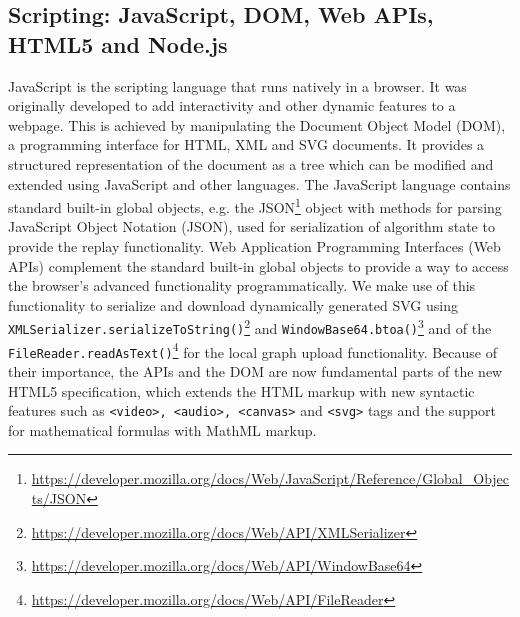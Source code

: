 \subsection{Scripting: JavaScript, DOM, Web APIs, HTML5 and Node.js}\label{sec:script}
JavaScript is the scripting language that runs natively in a browser. It was originally developed to  add interactivity and other dynamic features to a webpage. This is achieved by manipulating the Document Object Model (DOM), a programming interface for HTML, XML and SVG documents. It provides a structured representation of the document as a tree which can be modified and extended using JavaScript and other languages. The JavaScript language contains standard built-in global objects, e.g. the JSON\footnote{\url{https://developer.mozilla.org/docs/Web/JavaScript/Reference/Global_Objects/JSON}} object with methods for parsing JavaScript Object Notation (JSON), used for serialization of algorithm state to provide the replay functionality. Web Application Programming Interfaces (Web APIs) complement the standard built-in global objects to provide a way to access the browser's advanced functionality programmatically. We make use of this functionality to serialize and download dynamically generated SVG using \texttt{XMLSerializer.serializeToString()}\footnote{\url{https://developer.mozilla.org/docs/Web/API/XMLSerializer}} and \texttt{WindowBase64.btoa()}\footnote{\url{https://developer.mozilla.org/docs/Web/API/WindowBase64}} and of the \texttt{FileReader.readAsText()}\footnote{\url{https://developer.mozilla.org/docs/Web/API/FileReader}} for the local graph upload functionality. Because of their importance, the APIs and the DOM are now fundamental parts of the new HTML5 specification, which extends the HTML markup with new syntactic features such as \texttt{<video>, <audio>, <canvas>} and \texttt{<svg>} tags and the support for mathematical formulas with MathML markup.

